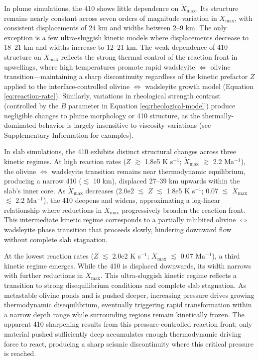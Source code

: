 \documentclass[draft,linenumbers]{agujournal2019}
\begin{document}
In plume simulations, the 410 shows little dependence on
\(\dot{X}_{\mathrm{max}}\). Its structure remains nearly constant across
seven orders of magnitude variation in \(\dot{X}_{\mathrm{max}}\), with
consistent displacements of 24 km and widths between 2--9 km. The only
exception is a few ultra-sluggish kinetic models where displacements
decrease to 18--21 km and widths increase to 12--21 km. The weak
dependence of 410 structure on \(\dot{X}_{\mathrm{max}}\) reflects the
strong thermal control of the reaction front in upwellings, where high
temperatures promote rapid wadsleyite \(\Leftrightarrow\) olivine
transition---maintaining a sharp discontinuity regardless of the kinetic
prefactor \(Z\) applied to the interface-controlled olivine
\(\Leftrightarrow\) wadsleyite growth model (Equation
\ref{eq:reaction-rate}). Similarly, variations in rheological strength
contrast (controlled by the \(B\) parameter in Equation
\ref{eq:rheological-model}) produce negligible changes to plume
morphology or 410 structure, as the thermally-dominated behavior is
largely insensitive to viscosity variations (see Supplementary
Information for examples).

In slab simulations, the 410 exhibits distinct structural changes across
three kinetic regimes. At high reaction rates (\(Z\) \(\gtrsim\) 1.8e5 K
s\(^{-1}\); \(\dot{X}_{\mathrm{max}}\) \(\gtrsim\) 2.2 Ma\(^{-1}\)), the
olivine \(\Leftrightarrow\) wadsleyite transition remains near
thermodynamic equilibrium, producing a narrow 410 (\(\lesssim\) 10 km),
displaced 27--39 km upwards within the slab's inner core. As
\(\dot{X}_{\mathrm{max}}\) decreases (2.0e2 \(\lesssim\) \(Z\)
\(\lesssim\) 1.8e5 K s\(^{-1}\); 0.07 \(\lesssim\)
\(\dot{X}_{\mathrm{max}}\) \(\lesssim\) 2.2 Ma\(^{-1}\)), the 410
deepens and widens, approximating a log-linear relationship where
reductions in \(\dot{X}_{\mathrm{max}}\) progressively broaden the
reaction front. This intermediate kinetic regime corresponds to a
partially inhibited olivine \(\Leftrightarrow\) wadsleyite phase
transition that proceeds slowly, hindering downward flow without
complete slab stagnation.

At the lowest reaction rates (\(Z\) \(\lesssim\) 2.0e2 K s\(^{-1}\);
\(\dot{X}_{\mathrm{max}}\) \(\lesssim\) 0.07 Ma\(^{-1}\)), a third
kinetic regime emerges. While the 410 is displaced downwards, its width
narrows with further reductions in \(\dot{X}_{\mathrm{max}}\). This
ultra-sluggish kinetic regime reflects a transition to strong
disequilibrium conditions and complete slab stagnation. As metastable
olivine ponds and is pushed deeper, increasing pressure drives growing
thermodynamic disequilibrium, eventually triggering rapid transformation
within a narrow depth range while surrounding regions remain kinetically
frozen. The apparent 410 sharpening results from this
pressure-controlled reaction front; only material pushed sufficiently
deep accumulates enough thermodynamic driving force to react, producing
a sharp seismic discontinuity where this critical pressure is reached.
\end{document}
